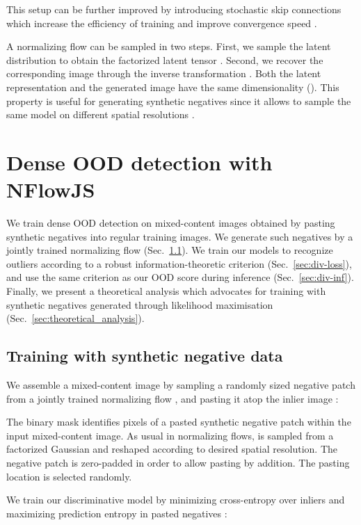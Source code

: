 \documentclass[lettersize,journal,hidelinks]{IEEEtran}
\begin{document}
This setup can be further improved by introducing stochastic skip connections which increase the efficiency of training and improve convergence speed \cite{grcic21neurips}.


A normalizing flow  can be sampled in two steps.
First, we sample the latent distribution to obtain the factorized latent tensor .
Second, we recover the corresponding image through the inverse transformation .
Both the latent representation and the generated image have the same dimensionality ().
This property is useful for generating synthetic negatives since it allows to sample the same model on different spatial resolutions \cite{dinh17iclr}.



\section{Dense OOD detection with NFlowJS}


We train dense OOD detection on
mixed-content images
obtained by pasting synthetic negatives
into regular training images.
We generate such negatives
by a jointly trained normalizing flow (Sec.\ \ref{sec:neg_ds_to_flow}).
We train our models to recognize outliers
according to a robust information-theoretic criterion (Sec.\ \ref{sec:div-loss}),
and use the same criterion as our OOD score
during inference (Sec.\ \ref{sec:div-inf}).
Finally, we present a theoretical analysis which advocates for training with synthetic negatives generated through likelihood maximisation (Sec.\ \ref{sec:theoretical_analysis}).
\subsection{Training with synthetic negative data}
\label{sec:neg_ds_to_flow}

We assemble a mixed-content image 
by sampling a randomly sized negative patch  
from a jointly trained normalizing flow ,
and pasting it atop the inlier image :

The binary mask  identifies pixels
of a pasted synthetic negative patch
within the input mixed-content image.
As usual in normalizing flows,  is sampled from a factorized Gaussian and reshaped according to desired spatial resolution.
The negative patch  is zero-padded in order to allow pasting by addition.
The pasting location is selected randomly.

We train our discriminative model by minimizing cross-entropy over inliers   and 
maximizing prediction entropy in pasted negatives \cite{hendrycks19iclr,lee18iclr,dhamija18nips}:
\end{document}
